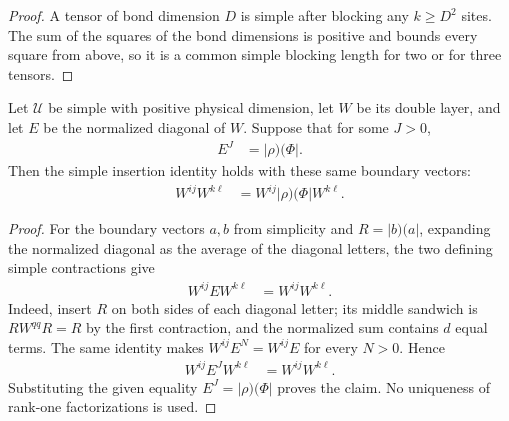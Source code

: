 \begin{proof}\leanok
    A tensor of bond dimension $D$ is simple after blocking any $k\geq D^2$
    sites.  The sum of the squares of the bond dimensions is positive and
    bounds every square from above, so it is a common simple blocking length
    for two or for three tensors.
\end{proof}

\begin{lemma}
    \label{thm:mpu_supplied_projector_simple2}
    \leanok
    Let $\mathcal U$ be simple with positive physical dimension, let $W$ be
    its double layer, and let $E$ be the normalized diagonal of $W$.  Suppose
    that for some $J>0$,
    \begin{align}
        E^J & =|\rho)(\Phi|.
    \end{align}
    Then the simple insertion identity holds with these same boundary
    vectors:
    \begin{align}
        W^{ij}W^{k\ell}
         & =W^{ij}|\rho)(\Phi|W^{k\ell}.
    \end{align}
\end{lemma}

\begin{proof}\leanok
    For the boundary vectors $a,b$ from simplicity and $R=|b)(a|$, expanding
    the normalized diagonal as the average of the diagonal letters, the two
    defining simple contractions give
    \begin{align}
        W^{ij} E W^{k\ell} & =W^{ij}W^{k\ell}.
    \end{align}
    Indeed, insert $R$ on both sides of each diagonal letter; its middle
    sandwich is $R W^{qq}R=R$ by the first contraction, and the normalized sum
    contains $d$ equal terms.  The same identity makes
    $W^{ij}E^N=W^{ij}E$ for every $N>0$.  Hence
    \begin{align}
        W^{ij}E^J W^{k\ell} & =W^{ij}W^{k\ell}.
    \end{align}
    Substituting the given equality $E^J=|\rho)(\Phi|$ proves the claim.
    No uniqueness of rank-one factorizations is used.
\end{proof}


